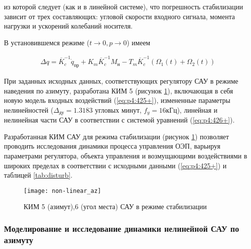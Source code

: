 из которой следует (как и в линейной системе), что погрешность стабилизации зависит от трех составляющих: угловой скорости входного сигнала, момента нагрузки и ускорений колебаний носителя.

В установившемся режиме ($t \longrightarrow 0, p \longrightarrow 0$) имеем\par

\begin{equation}
\label{eq:p4:428+}
\begin{alignedat}{2}
\Delta  q =
\overline K_{c}^{-1} \dot q_{\textit{пр}} + 
K_{m} \overline K_{c}^{-1} M_{\textit{н}} - 
T_{m} \overline K_{c}^{-1} (\Omega_{1}(t) + \Omega_{2}(t))
\end{alignedat}
\end{equation}

При заданных исходных данных, соответствующих регулятору САУ в режиме наведения по азимуту, разработана КИМ 5  (рисунок \ref{fig:non-linear}), включающая в себя новую модель входных воздействий (\ref{eq:p4:425+}), измененные параметры нелинейностей ($\Delta_{\textit{ду}} = 1.3183$ угловых минут, $f_{\textit{y}} = 16 \textit{кГц}$), линейная и нелинейная части САУ в соответствии с системой уравнений (\ref{eq:p4:426+}).\par

Разработанная КИМ САУ для режима стабилизации (рисунок \ref{fig:non-linear}) позволяет проводить исследования динамики процесса управления ОЭП, варьируя параметрами регулятора, объекта управления и возмущающими воздействиями в широких пределах в соответствии с исходными данными (\ref{eq:p4:425+}) и таблицей \ref{tab:disturb}.\par

\begin{figure}[ht]
	\centering
	\texttt{[image: non-linear\_az]} 
	\caption{КИМ 5 (азимут),6 (угол места) САУ в режиме стабилизации}
	\label{fig:non-linear}
\end{figure} 

\subsubsection{Моделирование и исследование динамики нелинейной САУ по азимуту} \label{subsec:ch4/sect6/sub1}

